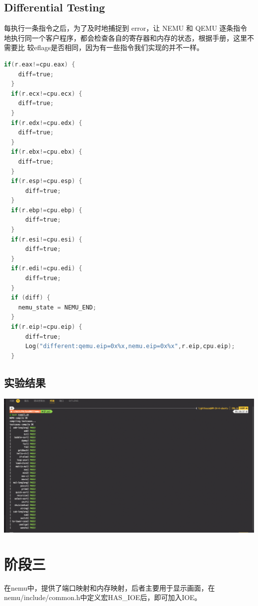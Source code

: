 \documentclass[UTF8,a4paper,10pt]{ctexart}
\begin{document}
\subsection{Differential Testing}
每执行一条指令之后，为了及时地捕捉到 error，让 NEMU 和 QEMU 逐条指令地执行同一个客户程序，都会检查各自的寄存器和内存的状态，根据手册，这里不需要比 较eflags是否相同，因为有一些指令我们实现的并不一样。

\begin{lstlisting}[language = C]
  if(r.eax!=cpu.eax) {
    diff=true;
  }
  if(r.ecx!=cpu.ecx) {
    diff=true;
  }
  if(r.edx!=cpu.edx) {
    diff=true;
  }
  if(r.ebx!=cpu.ebx) {
    diff=true;
  }
  if(r.esp!=cpu.esp) {
	  diff=true;
  }
  if(r.ebp!=cpu.ebp) {
	  diff=true;
  }
  if(r.esi!=cpu.esi) {
	  diff=true;
  }
  if(r.edi!=cpu.edi) {
	  diff=true;
  }
  if (diff) {
    nemu_state = NEMU_END;
  }
  if(r.eip!=cpu.eip) {
	  diff=true;
	  Log("different:qemu.eip=0x%x,nemu.eip=0x%x",r.eip,cpu.eip);
  }
\end{lstlisting}
\subsection{实验结果}
\begin{center}
  \includegraphics*[scale = 0.25]{runall}
\end{center}
\section{阶段三}
在nemu中，提供了端口映射和内存映射，后者主要用于显示画面，在
nemu/include/common.h中定义宏HAS\_IOE后，即可加入IOE。
\end{document}
